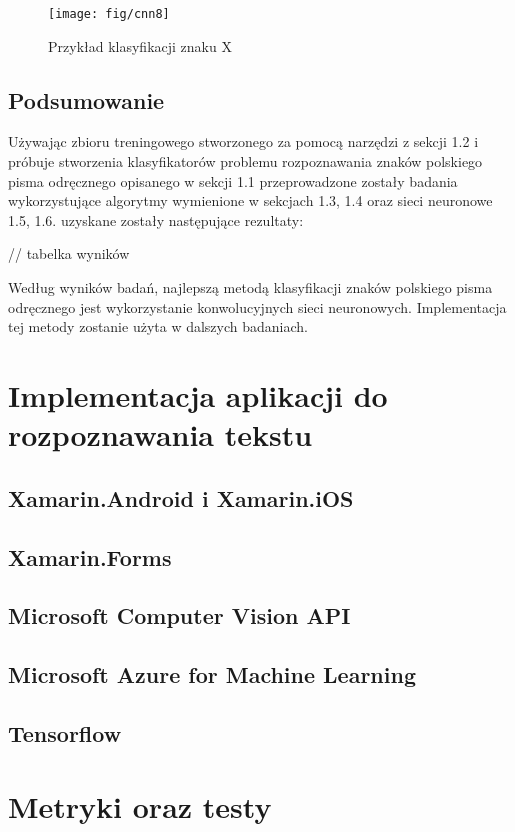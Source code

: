 \documentclass[brudnopis]{xmgr}
\begin{document}
\begin{figure}[!tbh]
\centering
\texttt{[image: fig/cnn8]}
\caption{Przykład klasyfikacji znaku X}
\end{figure}
\newpage

\section{Podsumowanie}

Używając zbioru treningowego stworzonego za pomocą narzędzi z sekcji 1.2 i próbuje stworzenia klasyfikatorów problemu rozpoznawania znaków polskiego pisma odręcznego opisanego w sekcji 1.1 przeprowadzone zostały badania wykorzystujące algorytmy wymienione w sekcjach 1.3, 1.4 oraz sieci neuronowe 1.5, 1.6. uzyskane zostały następujące rezultaty:

// tabelka wyników

Według wyników badań, najlepszą metodą klasyfikacji znaków polskiego pisma odręcznego jest wykorzystanie konwolucyjnych sieci neuronowych. Implementacja tej metody zostanie użyta w dalszych badaniach.

\chapter{Implementacja aplikacji do rozpoznawania tekstu}

\section{Xamarin.Android i Xamarin.iOS}

\section{Xamarin.Forms}

\section{Microsoft Computer Vision API}

\section{Microsoft Azure for Machine Learning}

\section{Tensorflow}

\chapter{Metryki oraz testy}
\end{document}
